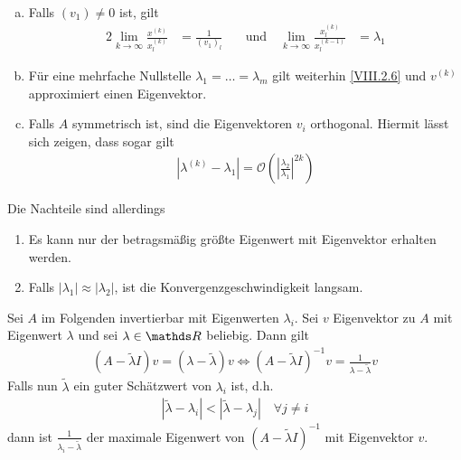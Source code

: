 \begin{Beme}~
  \begin{enumerate}[a)]
  \item Falls $(v_1)\neq 0$ ist, gilt
    \begin{alignat}{2}
      \lim_{k\to\infty} \frac{x^{(k)}}{x_l^{(k)}}
      &= \frac{1}{(v_1)_l}\quad
      &\text{und}\quad\lim_{k\to\infty}\frac{x_l^{(k)}}{x_l^{(k-1)}}
      &=\lambda_1
      \label{VIII.2.6}
    \end{alignat}
  \item Für eine mehrfache Nullstelle $\lambda_1=\ldots=\lambda_m$
    gilt weiterhin \eqref{VIII.2.6} und
    $v^{(k)}$ approximiert einen Eigenvektor.
  \item Falls $A$ symmetrisch ist,
    sind die Eigenvektoren $v_i$ orthogonal.
    Hiermit lässt sich zeigen, dass sogar gilt
    \begin{gather*}
      \left|\lambda^{(k)}-\lambda_1\right|
      = \mathcal{O}\left(\left|
        \frac{\lambda_2}{\lambda_1}
        \right|^{2k}\right)
    \end{gather*}
  \end{enumerate}
Die Nachteile sind allerdings
\begin{enumerate}[1)]
\item Es kann nur der betragsmäßig größte Eigenwert
  mit Eigenvektor erhalten werden.
\item Falls $|\lambda_1|\approx|\lambda_2|$,
  ist die Konvergenzgeschwindigkeit langsam.
\end{enumerate}
\end{Beme}


Sei $A$ im Folgenden invertierbar mit Eigenwerten $\lambda_i$.
Sei $v$ Eigenvektor zu $A$ mit Eigenwert $\lambda$ und
sei $\lambda\in\R$ beliebig. Dann gilt
\begin{gather*}
  (A-\widetilde{\lambda}I) v= (\lambda-\widetilde{\lambda})v
  \Leftrightarrow (A-\widetilde{\lambda}I)^{-1}v=
  \frac{1}{\lambda-\widetilde{\lambda}}v
\end{gather*}
Falls nun $\widetilde{\lambda}$ ein guter Schätzwert
von $\lambda_i$ ist, d.h.
\begin{gather*}
  |\widetilde{\lambda}-\lambda_i|<|\widetilde{\lambda}-\lambda_j|
  \quad \forall j\neq i
\end{gather*}
dann ist $\frac{1}{\lambda_i-\widetilde{\lambda}}$ 
der maximale Eigenwert von $(A-\widetilde{\lambda}I)^{-1}$
mit Eigenvektor $v$.







